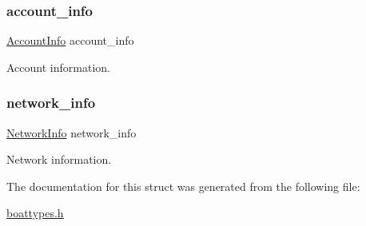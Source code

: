 \subsubsection{\texorpdfstring{account\+\_\+info}{account\_info}}
{\footnotesize\ttfamily \mbox{\hyperlink{boattypes_8h_a88968c7beb093674f9b4da03f30b1c21}{Account\+Info}} account\+\_\+info}



Account information. 

\mbox{\label{struct_t_boat_wallet_info_a8dd6ac7d1bf4e913c54ff1103cff1218}} 
\subsubsection{\texorpdfstring{network\+\_\+info}{network\_info}}
{\footnotesize\ttfamily \mbox{\hyperlink{boattypes_8h_ab4d27316866d80cf2c913e1369f45729}{Network\+Info}} network\+\_\+info}



Network information. 



The documentation for this struct was generated from the following file\+:\begin{DoxyCompactItemize}
\item 
\mbox{\hyperlink{boattypes_8h}{boattypes.\+h}}\end{DoxyCompactItemize}
